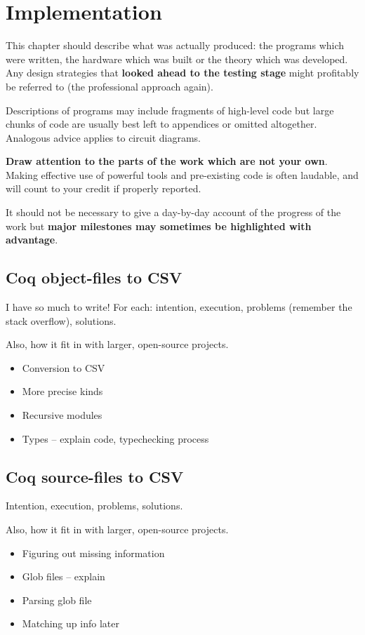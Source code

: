 \chapter{Implementation}

{\sf \color{red}
  This chapter should describe what was actually produced: the programs which
  were written, the hardware which was built or the theory which was developed.
  Any design strategies that \textbf{looked ahead to the testing stage} might profitably
  be referred to (the professional approach again). 

  Descriptions of programs may include fragments of high-level code but large
  chunks of code are usually best left to appendices or omitted altogether.
  Analogous advice applies to circuit diagrams. 

  \textbf{Draw attention to the parts of the work which are not your own}. Making
  effective use of powerful tools and pre-existing code is often laudable, and
  will count to your credit if properly reported. 

  It should not be necessary to give a day-by-day account of the progress of the
  work but \textbf{major milestones may sometimes be highlighted with advantage}.
}

\section{Coq object-files to CSV}
\color{red}
I have so much to write!
For each: intention, execution, problems (remember the stack overflow), solutions.

Also, how it fit in with larger, open-source projects.
\begin{itemize}
  \item Conversion to CSV
  \item More precise kinds
  \item Recursive modules
  \item Types -- explain code, typechecking process
\end{itemize}
\color{black}

\section{Coq source-files to CSV}
\color{red}
Intention, execution, problems, solutions.

Also, how it fit in with larger, open-source projects.
\begin{itemize}
  \item Figuring out missing information
  \item Glob files -- explain
  \item Parsing glob file
  \item Matching up info later
\end{itemize}
\color{black}

